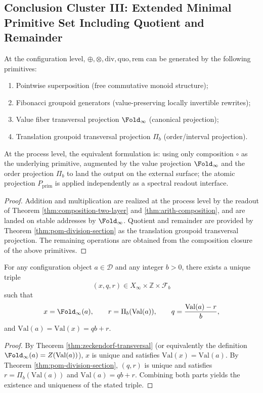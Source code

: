 \subsection{Conclusion Cluster III: Extended Minimal Primitive Set Including Quotient and Remainder}\label{subsec:pom-primitive-extended}
\begin{theorem}\label{thm:pom-extended-primitives}
At the configuration level, $\oplus,\otimes,\mathrm{div},\mathrm{quo},\mathrm{rem}$ can be generated by the following primitives:
\begin{enumerate}
  \item Pointwise superposition (free commutative monoid structure);
  \item Fibonacci groupoid generators (value-preserving locally invertible rewrites);
  \item Value fiber transversal projection $\Fold_\infty$ (canonical projection);
  \item Translation groupoid transversal projection $\Pi_b$ (order/interval projection).
\end{enumerate}
At the process level, the equivalent formulation is: using only composition $\circ$ as the underlying primitive, augmented by the value projection $\Fold_\infty$ and the order projection $\Pi_b$ to land the output on the external surface; the atomic projection $P_{\mathrm{prim}}$ is applied independently as a spectral readout interface.
\end{theorem}
\begin{proof}
Addition and multiplication are realized at the process level by the readout of Theorem \ref{thm:composition-two-layer} and \ref{thm:arith-composition}, and are landed on stable addresses by $\Fold_\infty$. Quotient and remainder are provided by Theorem \ref{thm:pom-division-section} as the translation groupoid transversal projection. The remaining operations are obtained from the composition closure of the above primitives.
\end{proof}

\begin{theorem}\label{thm:pom-double-transversal-normal-form}
For any configuration object $a\in\mathcal D$ and any integer $b>0$, there exists a unique triple
\[
\boxed{(x,q,r)\in X_\infty\times\mathbb{Z}\times\mathcal F_b}
\]
such that
\[
x=\Fold_\infty(a),\qquad
r=\Pi_b(\mathrm{Val}(a)),\qquad
q=\frac{\mathrm{Val}(a)-r}{b},
\]
and \(\mathrm{Val}(a)=\mathrm{Val}(x)=qb+r\).
\end{theorem}
\begin{proof}
By Theorem \ref{thm:zeckendorf-transversal} (or equivalently the definition \(\Fold_\infty(a)=Z(\mathrm{Val}(a))\)), \(x\) is unique and satisfies \(\mathrm{Val}(x)=\mathrm{Val}(a)\).
By Theorem \ref{thm:pom-division-section}, \((q,r)\) is unique and satisfies \(r=\Pi_b(\mathrm{Val}(a))\) and \(\mathrm{Val}(a)=qb+r\).
Combining both parts yields the existence and uniqueness of the stated triple.
\end{proof}

